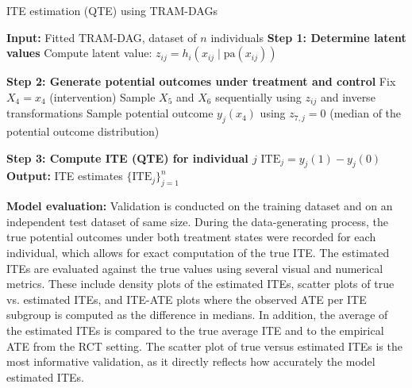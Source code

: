 \begin{algorithm}
\caption{ITE estimation (QTE) using TRAM-DAGs}
\label{alg:ite_qte}
\begin{algorithmic}
\State \textbf{Input:} Fitted TRAM-DAG, dataset of $n$ individuals
  \State \textbf{Step 1: Determine latent values}
    \State Compute latent value: $z_{ij} = h_i(x_{ij} \mid \text{pa}(x_{ij}))$
  \EndFor

  \State \textbf{Step 2: Generate potential outcomes under treatment and control}
   
    \State Fix $X_4 = x_4$ (intervention)
    \State Sample $X_5$ and $X_6$ sequentially using $z_{ij}$ and inverse transformations
    \State Sample potential outcome $y_j(x_4)$ using $z_{7,j} = 0$ (median of the potential outcome distribution)

  \EndFor

  \State \textbf{Step 3: Compute ITE (QTE) for individual $j$}
  \State $\text{ITE}_j = y_j(1) - y_j(0)$  %
\EndFor
\State \textbf{Output:} ITE estimates $\{\text{ITE}_j\}_{j=1}^n$
\end{algorithmic}
\end{algorithm}


\medskip

\textbf{Model evaluation:} Validation is conducted on the training dataset and on an independent test dataset of same size. During the data-generating process, the true potential outcomes under both treatment states were recorded for each individual, which allows for exact computation of the true ITE. The estimated ITEs are evaluated against the true values using several visual and numerical metrics. These include density plots of the estimated ITEs, scatter plots of true vs. estimated ITEs, and ITE-ATE plots where the observed ATE per ITE subgroup is computed as the difference in medians. In addition, the average of the estimated ITEs is compared to the true average ITE and to the empirical ATE from the RCT setting. The scatter plot of true versus estimated ITEs is the most informative validation, as it directly reflects how accurately the model estimated ITEs.














